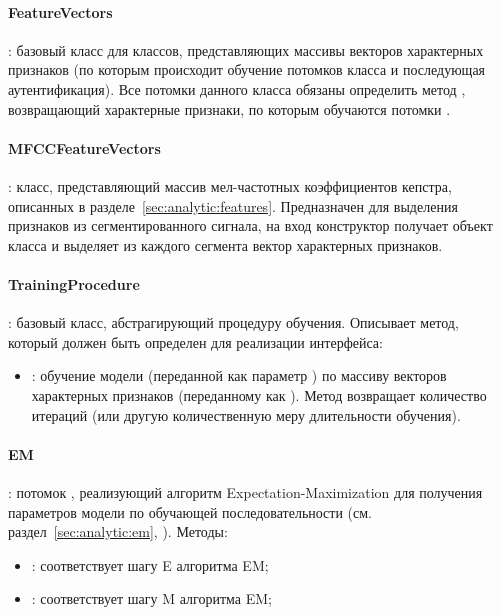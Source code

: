 \paragraph{FeatureVectors}: базовый класс для классов, представляющих массивы векторов характерных признаков (по которым происходит обучение потомков класса  и последующая аутентификация). Все потомки данного класса обязаны определить метод , возвращающий характерные признаки, по которым обучаются потомки .

\paragraph{MFCCFeatureVectors}: класс, представляющий массив мел-частотных коэффициентов кепстра, описанных в разделе~\ref{sec:analytic:features}. Предназначен для выделения признаков из сегментированного сигнала, на вход конструктор получает объект класса  и выделяет из каждого сегмента вектор характерных признаков.

\paragraph{TrainingProcedure}: базовый класс, абстрагирующий процедуру обучения. Описывает метод, который должен быть определен для реализации интерфейса:
\begin{itemize}
\item {}: обучение модели (переданной как параметр ) по массиву векторов характерных признаков (переданному как ). Метод возвращает количество итераций (или другую количественную меру длительности обучения).
\end{itemize}

\paragraph{EM}: потомок , реализующий алгоритм Expectation-Maximization для получения параметров модели по обучающей последовательности (см. раздел~\ref{sec:analytic:em}, \cite{Dempster77EM}). Методы:
\begin{itemize}
\item {}: соответствует шагу E алгоритма EM;
\item {}: соответствует шагу M алгоритма EM;
\end{itemize}


